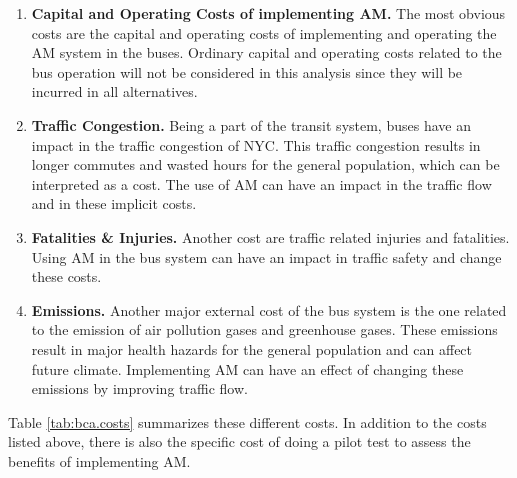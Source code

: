 \documentclass[11pt, letterpaper]{article}
\begin{document}
\begin{enumerate}[leftmargin=*]

\item \textbf{Capital and Operating Costs of implementing AM.}
  The most obvious costs are the capital and operating costs of implementing
  and operating the AM system in the buses. Ordinary capital and operating costs
  related to the bus operation will not be considered in this analysis since they
  will be incurred in all alternatives.
  
\item \textbf{Traffic Congestion.}
  Being a part of the transit system, buses have an impact in the traffic congestion
  of NYC. This traffic congestion results in longer commutes and wasted hours for 
  the general population, which can be interpreted as a cost. The use of AM can 
  have an impact in the traffic flow and in these implicit costs.

\item \textbf{Fatalities \& Injuries.}  Another cost are traffic related injuries and fatalities. 
  Using AM in the bus system can have an impact in traffic safety and change these costs. 

\item \textbf{Emissions.}
  Another major external cost of the bus system is the one related to
  the emission of air pollution gases and greenhouse gases. These emissions result
  in major health hazards for the general population and can affect future climate. Implementing 
  AM can have an effect of changing these emissions by improving traffic flow.
  
\end{enumerate}


Table \ref{tab:bca.costs} summarizes these different costs. In addition to the costs listed above, there is 
also the specific cost of doing a pilot test to assess the benefits of implementing AM.
\end{document}
